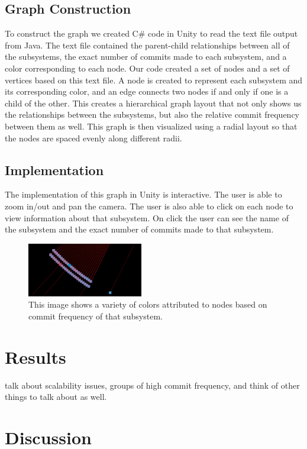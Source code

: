 \documentclass[conference]{IEEEtran}
\begin{document}
\subsection{Graph Construction}
To construct the graph we created C\# code in Unity to read the text file output from Java. The text file contained the parent-child relationships between all of the subsystems, the exact number of commits made to each subsystem, and a color corresponding to each node. Our code created a set of nodes and a set of vertices based on this text file. A node is created to represent each subsystem and its corresponding color, and an edge connects two nodes if and only if one is a child of the other. This creates a hierarchical graph layout that not only shows us the relationships between the subsystems, but also the relative commit frequency between them as well. This graph is then visualized using a radial layout so that the nodes are spaced evenly along different radii.

\subsection{Implementation}
The implementation of this graph in Unity is interactive. The user is able to zoom in/out and pan the camera. The user is also able to click on each node to view information about that subsystem. On click the user can see the name of the subsystem and the exact number of commits made to that subsystem. 

\begin{figure}[h!]
	\centering
	\includegraphics[width=0.45\textwidth]{randomSection.png}
	\caption{This image shows a variety of colors attributed to nodes based on commit frequency of that subsystem.}
\end{figure}

\section{Results}

talk about scalability issues, groups of high commit frequency, and think of other things to talk about as well.

\section{Discussion}
\end{document}
